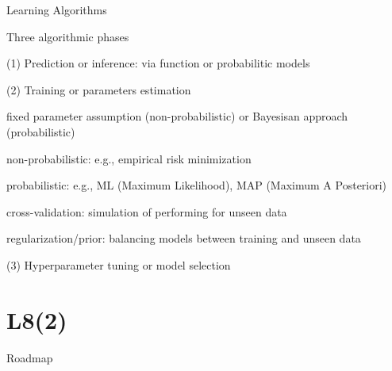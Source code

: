 \documentclass[handout,fleqn,aspectratio=169]{beamer}
\begin{document}
\begin{frame}{Learning Algorithms}

\plitemsep 0.07in

\bci 

\item[] Three algorithmic phases

\item[(1)] Prediction or inference: via function or probabilitic models

\item[(2)] Training or parameters estimation 

\bci
\item fixed parameter assumption (non-probabilistic) or Bayesisan approach (probabilistic)
\item non-probabilistic: e.g., empirical risk minimization
\item probabilistic: e.g., ML (Maximum Likelihood), MAP (Maximum A Posteriori)
\item cross-validation: simulation of performing for unseen data
\item regularization/prior: balancing models between training and unseen data

\eci
\item[(3)] Hyperparameter tuning or model selection
\eci
\end{frame}

\section{L8(2)}
\begin{frame}{Roadmap}

\plitemsep 0.1in

\bce[(1)] 

\item {}
\item {} 
\item {}

\ece
\end{frame}
\end{document}

